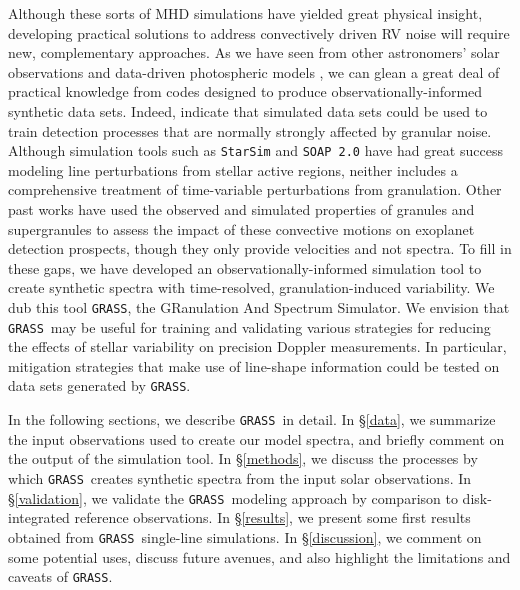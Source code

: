 \documentclass[twocolumn]{aastex63}
\newcommand{\grass}{\texttt{GRASS}}
\newcommand{\revise}[1]{#1}
\begin{document}
% 

Although these sorts of MHD simulations have yielded great physical insight, developing practical solutions to address convectively driven RV noise will require \revise{new, complementary} approaches. As we have seen from other astronomers' solar observations and data-driven photospheric models \citep[e.g.,][]{Dumusque2014, Haywood2016}, we can glean a great deal of practical knowledge from codes designed to produce observationally-informed synthetic data sets. \revise{Indeed, \citet{Sulis2017} indicate that simulated data sets could be used to train detection processes that are normally strongly affected by granular noise.} Although \revise{simulation tools such as} \texttt{StarSim} and \texttt{SOAP 2.0} have had great success modeling line perturbations from stellar active regions, neither includes a comprehensive treatment of time-variable perturbations from granulation. \revise{Other past works have used the observed and simulated properties of granules \citep{Meunier2015} and supergranules \citep{Meunier2019, Meunier2020a} to assess the impact of these convective motions on exoplanet detection prospects, though they only provide velocities and not spectra.} To fill in \revise{these gaps,} we have developed an observationally-informed simulation tool to create synthetic spectra with time-resolved, granulation-induced variability. We dub this tool \texttt{GRASS}, the GRanulation And Spectrum Simulator. \revise{We envision that \grass\ may be useful for training and validating various strategies for reducing the effects of stellar variability on precision Doppler measurements. In particular, mitigation strategies that make use of line-shape information could be tested on data sets generated by \grass. } \par 

In the following sections, we describe \grass\ in detail. In \S\ref{data}, we summarize the input observations used to create our model spectra, and briefly comment on the output of the simulation tool. In \S\ref{methods}, we discuss the processes by which \grass\ creates synthetic spectra from the input solar observations. In \S\ref{validation}, we validate the \grass\ modeling approach by comparison to disk-integrated reference observations. In \S\ref{results}, we present some first results obtained from \grass\ single-line simulations. In \S\ref{discussion}, we comment on some potential uses, discuss future avenues, and also highlight the limitations and caveats of \grass. \par 
\end{document}
